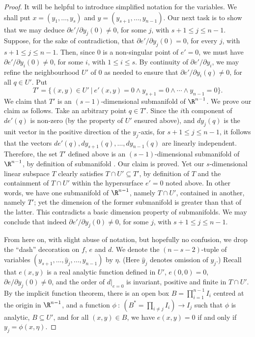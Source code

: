 \documentclass{article}
\begin{document}
\begin{proof}
It will be helpful to introduce simplified notation for the variables.
We shall put $x = (y_1, \ldots, y_s)$ and 
$y = (y_{s+1}, \ldots, y_{n-1})$.
Our next task is to show that we may deduce 
$\partial e'/\partial y_j (0) \neq 0$, for some $j$, 
with $s+1 \le j \le n-1$.
Suppose, for the sake of contradiction, that
$\partial e'/\partial y_j (0) = 0$, for every $j$, with 
$s+1 \le j \le n-1$. Then, since $0$ is a non-singular point of
$e' = 0$, we must have $\partial e'/\partial y_i (0) \neq 0$, for some
$i$, with $1 \le i \le s$. By continuity of $\partial e'/\partial y_i$,
we may refine the neighbourhood $U'$ of $0$ as needed to ensure that
$\partial e'/\partial y_i (q) \neq 0$, for all $q \in U'$.
Put 
\[T' = \{(x,y) \in U'~|~e'(x,y) = 0 \wedge 
                       y_{s+1} = 0 \wedge \cdots \wedge y_{n-1} = 0\}.\]
We claim that $T'$ is an $(s-1)$-dimensional submanifold of $\R^{n-1}$.
We prove our claim as follows. Take an arbitrary point $q \in T'$.
Since the $i$th component of $de'(q)$ is non-zero
(by the property of $U'$ ensured above), and
$dy_j(q)$ is the unit vector in the positive direction of the 
$y_j$-axis, for $s+1 \le j \le n-1$, it follows that the vectors
$de'(q), dy_{s+1}(q), \ldots, dy_{n-1}(q)$ are linearly independent.
Therefore, the set $T'$ defined above is an $(s-1)$-dimensional
submanifold of $\R^{n-1}$, by definition of submanifold
\cite{McCallum1988, Whitney1972}. Our claim is proved.
Yet our $s$-dimensional linear
subspace $T$ clearly satisfies $T \cap U' \subseteq T'$,
by definition of $T$ and the containment of $T \cap U'$ within 
the hypersurface $e' = 0$ noted above.
In other words, we have one submanifold of $\R^{n-1}$, namely
$T \cap U'$, contained in another, namely $T'$; yet the dimension of
the former submanifold is greater than that of the latter.
This contradicts a basic dimension property of submanifolds.
We may conclude that indeed
$\partial e'/\partial y_j (0) \neq 0$, for some $j$, 
with $s+1 \le j \le n-1$.

From here on, with slight abuse of notation, but hopefully no confusion,
we drop the ``dash'' decoration on $f$, $e$ and $d$.
We denote the $(n-s-2)$-tuple of variables
$(y_{s+1}, \ldots, \hat{y}_j, \ldots, y_{n-1})$ by $\eta$.
(Here $\hat{y}_j$ denotes omission of $y_j$.)
Recall that $e(x,y)$ is a real analytic function defined in $U'$,
$e(0,0) = 0$, $\partial e/\partial y_j (0) \neq 0$,
and the order of $d|_{e=0}$ is invariant, positive and finite
in $T \cap U'$. By the implicit function theorem,
there is an open box $B = \prod_{i=1}^{n-1} I_i$ 
centred at the origin in $\R^{n-1}$, and a function 
$\phi~:~(B^* = \prod_{i \neq j} I_i) \rightarrow I_j$ such that
$\phi$ is analytic, $B \subseteq U'$, and
for all $(x,y) \in B$,
we have $e(x,y) = 0$ if and only if $y_j = \phi(x, \eta)$.


\end{proof}
\end{document}
